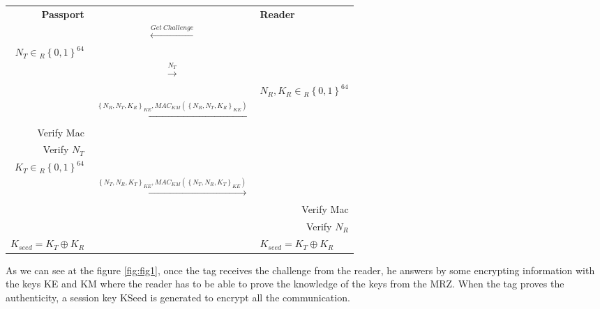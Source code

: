 \documentclass{acm_proc_article-sp}
\begin{document}

\begin{figure*}[t]
  \centering
	\begin{tabular}{p{3.8cm}cp{4.5cm}}
		\multicolumn{1}{r}{\textbf{Passport}} & &
        \multicolumn{1}{l}{\textbf{Reader}}\\ 	
        &$\xleftarrow{ Get\ Challenge }$& \\
		\multicolumn{1}{r}{$N_T \in{_R \left\{{0,1}\right\}}^{64}$} & & \\               
		&$\xrightarrow{ N_T }$& \\
		
        &&\multicolumn{1}{l}{$N_R,K_R \in{_R \left\{{0,1}\right\}}^{64}$}\\ 
		&$\xleftarrow{\left\{{N_R,N_T,K_R}\right\}_{KE},MAC_{KM}(\left\{{N_R,N_T,K_R}\right\}_{KE})}$& \\
		\multicolumn{1}{r}{Verify Mac} & & \\
		\multicolumn{1}{r}{Verify $N_T$} & & \\				
		\multicolumn{1}{r}{$K_T \in{_R \left\{{0,1}\right\}}^{64}$} & & \\               		
		&$\xrightarrow{\left\{{N_T,N_R,K_T}\right\}_{KE},MAC_{KM}(\left\{{N_T,N_R,K_T}\right\}_{KE})}$& \\
		&&\multicolumn{1}{r}{Verify Mac}\\
		&&\multicolumn{1}{r}{Verify $N_R$}\\
		\multicolumn{1}{r}{$K_{seed} = K_T\oplus{}K_R $} & &
        \multicolumn{1}{l}{$K_{seed} = K_T\oplus{}K_R $}\\		
	\end{tabular}
  \caption{BAC protocol sesion.}
  \label{fig:fig1}
\end{figure*}


As we can see at the figure 
\ref{fig:fig1}, 
once the tag receives the challenge from the reader, he answers 
by some encrypting information with the keys KE and KM where the reader has to be able to prove the 
knowledge of the keys from the MRZ. When the tag proves the authenticity, a session key KSeed 
is generated to encrypt all the communication.
\end{document}
